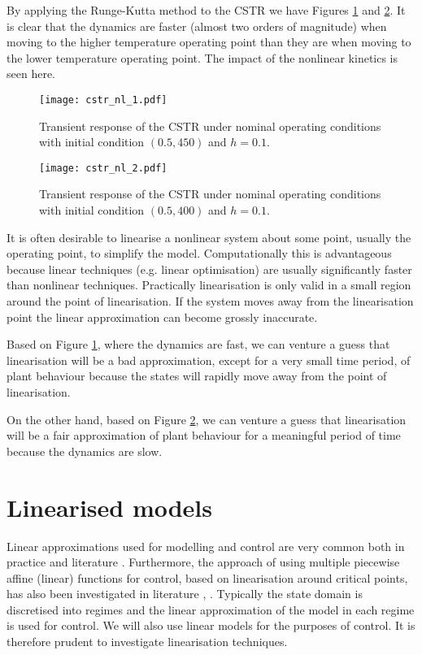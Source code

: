 By applying the Runge-Kutta method to the CSTR we have Figures \ref{fig_cstr_nl_1} and \ref{fig_cstr_nl_2}. It is clear that the dynamics are faster (almost two orders of magnitude) when moving to the higher temperature operating point than they are when moving to the lower temperature operating point. The impact of the nonlinear kinetics is seen here. 
\begin{figure}[H] 
\centering
\texttt{[image: cstr\_nl\_1.pdf]}
\caption{Transient response of the CSTR under nominal operating conditions with initial condition $(0.5, 450)$ and $h=0.1$.}
\label{fig_cstr_nl_1}
\end{figure}
\begin{figure}[H] 
\centering
\texttt{[image: cstr\_nl\_2.pdf]}
\caption{Transient response of the CSTR under nominal operating conditions with initial condition $(0.5, 400)$ and $h=0.1$.}
\label{fig_cstr_nl_2}
\end{figure}
It is often desirable to linearise a nonlinear system about some point, usually the operating point, to simplify the model. Computationally this is advantageous because linear techniques (e.g. linear optimisation) are usually significantly faster than nonlinear techniques. Practically linearisation is only valid in a small region around the point of linearisation. If the system moves away from the linearisation point the linear approximation can become grossly inaccurate. 

Based on Figure \ref{fig_cstr_nl_1}, where the dynamics are fast, we can venture a guess that linearisation will be a bad approximation, except for a very small time period, of plant behaviour because the states will rapidly move away from the point of linearisation.

On the other hand, based on Figure \ref{fig_cstr_nl_2}, we can venture a guess that linearisation will be a fair approximation of plant behaviour for a meaningful period of time because the dynamics are slow.

\section{Linearised models}
Linear approximations used for modelling and control are very common both in practice and literature \cite{luyben}. Furthermore, the approach of using multiple piecewise affine (linear) functions for control, based on linearisation around critical points, has also been investigated in literature \cite{du}, \cite{kvasnica}. Typically the state domain is discretised into regimes and the linear approximation of the model in each regime is used for control. We will also use linear models for the purposes of control.  It is therefore prudent to investigate linearisation techniques.

